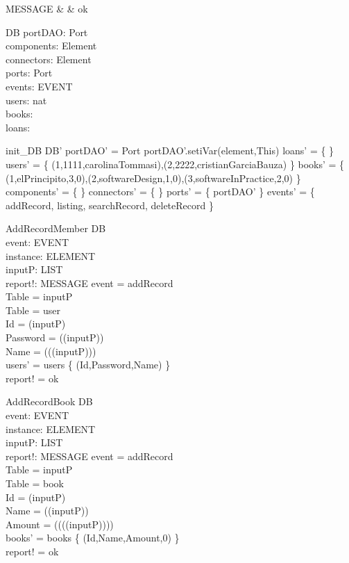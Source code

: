 \begin{zed}
MESSAGE & \ddef & ok 
\end{zed}

\begin{schema}{DB}
portDAO: Port \\
components: \pset Element \\
connectors: \pset Element \\
ports: \pset Port \\
events: \pset EVENT \\
users: \nat \cross \nat \cross nat \\
books: \nat \cross \nat \cross \nat \cross \nat \\
loans: \nat \rel \nat 
\end{schema}

\begin{zed}
init\_DB \sdef \lsch 
DB' \bbar 
portDAO' = \new Port 
\land portDAO'.setiVar(element,This)  
\land loans' = \{ \}
\land users' = \{ (1,1111,carolinaTommasi),(2,2222,cristianGarciaBauza) \}
\land books' = \{ (1,elPrincipito,3,0),(2,softwareDesign,1,0),(3,softwareInPractice,2,0) \}
\land components' = \{ \}
\land connectors' = \{  \}
\land ports' = \{ portDAO' \}  
\land events' = \{ addRecord, listing, searchRecord, deleteRecord \}
\rsch \end{zed}


\begin{schema}{AddRecordMember}
\Delta DB \\
event: EVENT \\
instance: ELEMENT \\
inputP: LIST \\
report!: MESSAGE
\where event = addRecord \\
Table = \head inputP \\
Table = user \\
Id = \head (\tail inputP) \\
Password = \head (\tail (\tail inputP)) \\
Name = \head (\tail (\tail (\tail inputP))) \\
users' = users \uni \{ (Id,Password,Name) \} \\
report! = ok 
\end{schema}

\begin{schema}{AddRecordBook}
\Delta DB \\
event: EVENT \\
instance: ELEMENT \\
inputP: LIST \\
report!: MESSAGE
\where event = addRecord \\
Table = \head inputP \\
Table = book \\
Id = \head (\tail inputP) \\
Name = \head (\tail (\tail inputP)) \\
Amount = \head (\tail (\tail (\tail (inputP)))) \\
books' = books \uni \{ (Id,Name,Amount,0) \} \\
report! = ok 
\end{schema}

